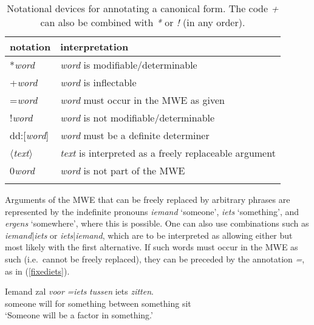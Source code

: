 \documentclass[output=paper,colorlinks,citecolor=brown]{langscibook}
\begin{document}
\begin{table}[htb]
    \centering
    \begin{tabular}{ll}
    \lsptoprule
       notation & interpretation\\
    \midrule
       *\textit{word}  & \textit{word} is modifiable/determinable\\
       +\textit{word}  &  \textit{word} is inflectable\\
        =\textit{word}  & \textit{word} must occur in the MWE as given\\
        !\textit{word} & \textit{word} is not modifiable/determinable\\
        dd:[\textit{word}] & \textit{word} must be a definite determiner\\
        〈\textit{text}〉 & \textit{text} is interpreted as a freely replaceable argument\\
        0\textit{word} & \textit{word} is not part of the MWE\\
    \lspbottomrule
    \end{tabular}
    \caption{Notational devices for annotating a canonical form. The code \textit{+} can also be combined with \textit{*} or \textit{!} (in any order).}
    \label{tab:annotationtable}
\end{table}

Arguments of the MWE that can be freely replaced by arbitrary phrases are represented by the indefinite pronouns \textit{iemand} `someone', \textit{iets} `something', and \textit{ergens} `somewhere', where this is possible. One can also use combinations such as \textit{iemand}|\textit{iets} or \textit{iets}|\textit{iemand}, which are to be interpreted as allowing either but most likely with the first alternative. If such words must occur  in the MWE as such (i.e.\ cannot be freely replaced), they can be preceded by the annotation \textit{=}, as in (\ref{fixediets}).

\begin{exe}
\ex \gll Iemand zal  \textit{voor} \textit{=iets} \textit{tussen} iets \textit{zitten}.\\
someone will  for something between something sit\\ \label{fixediets}
\glt `Someone will be a factor in something.'
\end{exe}
\end{document}
